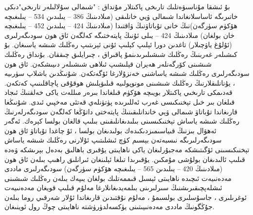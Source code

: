 \documentclass[a4paper]{article}
\begin{document}
بۇ ئىشقا مۇناسىۋەتلىك تارىخى پاكىتلار مۇنداق : "شىمالى سۇلالىلەر تارىخى"دىكى خاتىرىگە ئاساسلانغاندا شىمالى ۋېي خانلىقى (مىلادىنىڭ 386 – يىلىدىن 534 – يىلىغىچە ھۆكۈم سۈرگەن)نىڭ خانى تۇباتاۋنىڭ ۋاقتىدا (مىلادىنىڭ 424 – يىلىدىن 452 – يىلىغىچە خان بولغان) مىلادىنىڭ 424 – يىلى ئۇنىڭ پايتەختىگە كەلگەن ئاق ھون سودىگەرلىرى (ئۇلۇغ ياۋچىلار) تاغدىن دورا ئېلىپ كېلىپ ئۇنى ئېرىتىپ رەڭلىك شىشە ياسىغان. بۇ كىشىلەر غەربنىڭ رەڭلىك شىشىلىرىدىنمۇ پاقىراق ، چىرايلىق چىققان. بۇنداق رەڭلىك شىشىنى كۆرگەنلەر ھەيران قېلىشىپ ئىلاھى شىشىلەر دىيىشكەن. ئاق ھون سودىگەرلىرى رەڭلىك شىشە ياساشنى خەنزۇلارغا ئۆگەتكەن. شۇنىڭدىن باشلاپ سۈرىيە ، يۇنانلىقلارنىڭ رەڭلىك شىشىنى مونوپولىيە قىلىۋېلىش ھوقۇقى پاچاقلىنىپ كەتكەن. قەدىمكى تارىخىي پاكىتلار بويىچە ھۆكۈم قىلغاندا بىرەر مىللەت ياكى خەلقنىڭ ئىجاد قىلغان بىر خىل تېخنىكىسى غەرب ئەللىرىدە پۈتۈنلەي قەتئى مەخپىي ئىدى. شۇنىڭغا قارىغاندا تۇباتاۋ شىمالى ۋېي خاندانلىقىنىڭ پايتەختى داتۇڭغا كەلگەن سودىگەرلەرنىڭ رەڭلىك شىشە ياساش تېخنىكىسىنى بىلىدىغانلىقىنى بىلىپ قالغان بولسا كېرەك. ئەگەر ئەھۋال بىزنىڭ قىياسىمىزدىكىدەك بولىدىغان بولسا ، ئۇ چاغدا تۇباتاۋ ئاق ھون سودىگەرلىرىگە نىسبەتەن بېسىم كۈچ ئىشلىتىپ ئۇلارنى رەڭلىك شىشە ياساش تېخنىكىسىنى ئۆگىتىشكە مەجبۇرلىغان ياكى ناھايىتى يۇقىرى باھالىق بەدەل بېرىشكە ۋەدە قىلىپ ئالىدىغان بولۇشى مۇمكىن. يۇقىرىدا تىلغا ئېلىنغان ئىرانلىق راھىپ بىلەن ئاق ھون (مىلادىنىڭ 420 – يىلىدىن 565 – يىلىغىچە ھۆكۈم سۈرگەن) سودىگەرلىرى ماددى مەدەنىيەت ئىچىدە ناھايىتى ئېسىل قىممەتلىك بولغان يىپەك بىلەن رەڭلىك شىشىنى ئىشلەپچىقىرىشنىڭ سىرلىرىنى بىلمەيدىغانلارغا مەلۇم قىلىپ قويغان مەدەنىيەت ئوغرىلىرى ، جاسۇسلىرى بولسىمۇ ، مەلۇم نۇقتىدىن قارىغاندا ئۇلار شەرقىي روما بىلەن جۇڭگونىڭ ماددى مەدەنىيىتىنى يۈكسەلدۈرۈشتە ناھايىتى چوڭ رول ئوينىغان.
\end{document}
